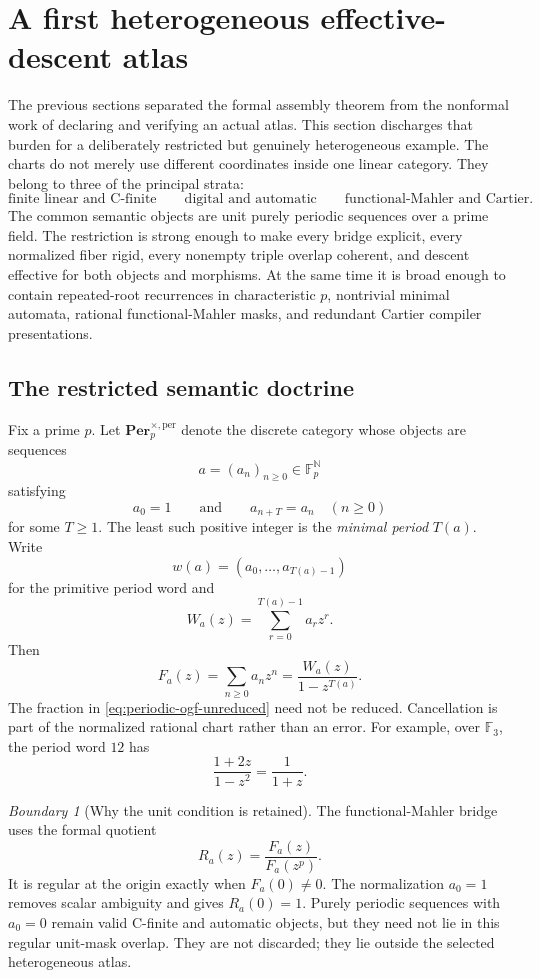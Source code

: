 \documentclass[11pt]{article}
\theoremstyle{definition}
\theoremstyle{remark}
\newtheorem{boundary}[theorem]{Boundary}
\newcommand{\Per}{\mathbf{Per}}
\begin{document}
\section{A first heterogeneous effective-descent atlas}
\label{sec:periodic-heterogeneous-atlas}

The previous sections separated the formal assembly theorem from the nonformal work of declaring and verifying an actual atlas.  This section discharges that burden for a deliberately restricted but genuinely heterogeneous example.  The charts do not merely use different coordinates inside one linear category.  They belong to three of the principal strata:
\[
\text{finite linear and C-finite}
\qquad
\text{digital and automatic}
\qquad
\text{functional-Mahler and Cartier}.
\]
The common semantic objects are unit purely periodic sequences over a prime field.  The restriction is strong enough to make every bridge explicit, every normalized fiber rigid, every nonempty triple overlap coherent, and descent effective for both objects and morphisms.  At the same time it is broad enough to contain repeated-root recurrences in characteristic \(p\), nontrivial minimal automata, rational functional-Mahler masks, and redundant Cartier compiler presentations.

\subsection{The restricted semantic doctrine}

Fix a prime \(p\).  Let \(\Per_p^{\times,\mathrm{per}}\) denote the discrete category whose objects are sequences
\[
a=(a_n)_{n\geq 0}\in \mathbb F_p^{\mathbb N}
\]
satisfying
\[
a_0=1
\qquad\text{and}\qquad
 a_{n+T}=a_n
\quad(n\geq 0)
\]
for some \(T\geq 1\).  The least such positive integer is the \emph{minimal period} \(T(a)\).  Write
\[
w(a)=(a_0,\ldots,a_{T(a)-1})
\]
for the primitive period word and
\[
W_a(z)=\sum_{r=0}^{T(a)-1}a_rz^r.
\]
Then
\begin{equation}
\label{eq:periodic-ogf-unreduced}
F_a(z)=\sum_{n\geq 0}a_nz^n
=
\frac{W_a(z)}{1-z^{T(a)}}.
\end{equation}
The fraction in \cref{eq:periodic-ogf-unreduced} need not be reduced.  Cancellation is part of the normalized rational chart rather than an error.  For example, over \(\mathbb F_3\), the period word \(12\) has
\[
\frac{1+2z}{1-z^2}=\frac{1}{1+z}.
\]

\begin{boundary}[Why the unit condition is retained]
The functional-Mahler bridge uses the formal quotient
\[
R_a(z)=\frac{F_a(z)}{F_a(z^p)}.
\]
It is regular at the origin exactly when \(F_a(0)\neq 0\).  The normalization \(a_0=1\) removes scalar ambiguity and gives \(R_a(0)=1\).  Purely periodic sequences with \(a_0=0\) remain valid C-finite and automatic objects, but they need not lie in this regular unit-mask overlap.  They are not discarded; they lie outside the selected heterogeneous atlas.
\end{boundary}
\end{document}
